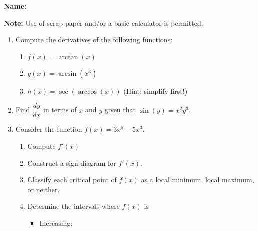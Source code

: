 \documentclass[12pt]{article}
\newcommand{\points}[1]{\marginpar{\hspace{24pt}[#1]}}
\begin{document}
{\bf \large Name:} \hspace{2.5in} 

\bigskip

{\bf Note:} Use of scrap paper and/or a basic calculator is permitted.

\thispagestyle{fancy}

 \begin{enumerate}
 \item  Compute the derivatives of the following functions:
\begin{enumerate}
 \item $f(x) = \arctan(x)$ \points{2}

\vspace{1.5in}

 \item $g(x) = \arcsin(x^3)$ \points{2}

\vspace{2in}

 \item $h(x) = \sec(\arccos(x))$ \points{2} \quad (Hint: simplify first!)

\vspace{1.5in}

\end{enumerate}

\item Find $\dfrac{dy}{dx}$ in terms of $x$ and $y$ given that \points{3} $\sin(y)=x^2y^3$.


\newpage

\item Consider the function $f(x)=3x^5-5x^3$.
\begin{enumerate}
 \item Compute $f'(x)$ \points{1}

\vspace{0.5in}

 \item Construct a sign diagram for $f'(x)$. \points{1}

\vspace{1.1in}

 \item Classify each critical point of $f(x)$ \points{1} as a local minimum, local maximum, or neither.

\vspace{1.25in}

 \item Determine the intervals where $f(x)$ is\points{2}
\begin{itemize}
 \item Increasing:


\end{itemize}
\end{enumerate}
\end{enumerate}
\end{document}
